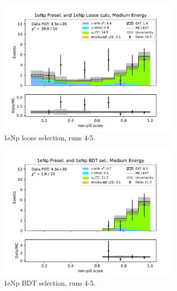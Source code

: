 \begin{figure}[H]
\begin{subfigure}{0.33\linewidth}
        \includegraphics[width=\linewidth]{technote/Sidebands/Figures/NearSideband/near_sideband_nonpi0_score_run4b4c4d5_NP_NPL_MEDIUM_ENERGY.pdf}
        \caption{1eNp loose selection, runs 4-5.}
    \end{subfigure}%
    \begin{subfigure}{0.33\linewidth}
        \includegraphics[width=\linewidth]{technote/Sidebands/Figures/NearSideband/near_sideband_nonpi0_score_run4b4c4d5_NP_NPBDT_MEDIUM_ENERGY.pdf}
        \caption{1eNp BDT selection, runs 4-5.}
    \end{subfigure}    
    \begin{subfigure}{0.33\linewidth}

\end{subfigure}
\end{figure}
